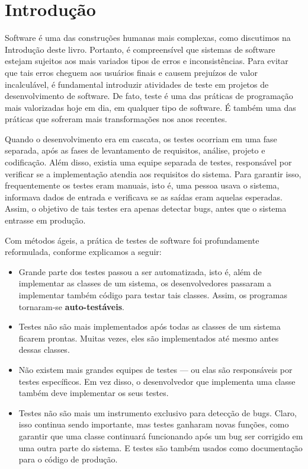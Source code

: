 \documentclass[
  11pt,
  twoside]{book}
\begin{document}
\hypertarget{introduuxe7uxe3o-5}{%
\section{Introdução}\label{introduuxe7uxe3o-5}}


Software é uma das construções humanas mais complexas, como discutimos
na Introdução deste livro. Portanto, é compreensível que sistemas de
software estejam sujeitos aos mais variados tipos de erros e
inconsistências. Para evitar que tais erros cheguem aos usuários finais
e causem prejuízos de valor incalculável, é fundamental introduzir
atividades de teste em projetos de desenvolvimento de software. De fato,
teste é uma das práticas de programação mais valorizadas hoje em dia, em
qualquer tipo de software. É também uma das práticas que sofreram mais
transformações nos anos recentes.

Quando o desenvolvimento era em cascata, os testes ocorriam em uma fase
separada, após as fases de levantamento de requisitos, análise, projeto
e codificação. Além disso, existia uma equipe separada de testes,
responsável por verificar se a implementação atendia aos requisitos do
sistema. Para garantir isso, frequentemente os testes eram manuais, isto
é, uma pessoa usava o sistema, informava dados de entrada e verificava
se as saídas eram aquelas esperadas. Assim, o objetivo de tais testes
era apenas detectar bugs, antes que o sistema entrasse em produção.

Com métodos ágeis, a prática de testes de software foi profundamente
reformulada, conforme explicamos a seguir:

\begin{itemize}
\item
  Grande parte dos testes passou a ser automatizada, isto é, além de
  implementar as classes de um sistema, os desenvolvedores passaram a
  implementar também código para testar tais classes. Assim, os
  programas tornaram-se \textbf{auto-testáveis}.
\item
  Testes não são mais implementados após todas as classes de um sistema
  ficarem prontas. Muitas vezes, eles são implementados até mesmo antes
  dessas classes.
\item
  Não existem mais grandes equipes de testes --- ou elas são
  responsáveis por testes específicos. Em vez disso, o desenvolvedor que
  implementa uma classe também deve implementar os seus testes.
\item
  Testes não são mais um instrumento exclusivo para detecção de bugs.
  Claro, isso continua sendo importante, mas testes ganharam novas
  funções, como garantir que uma classe continuará funcionando após um
  bug ser corrigido em uma outra parte do sistema. E testes são também
  usados como documentação para o código de produção.
\end{itemize}
\end{document}
